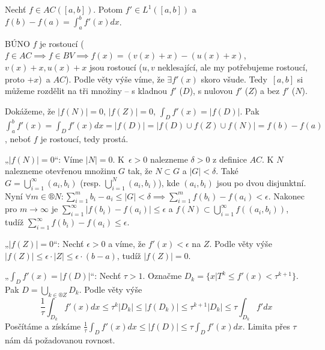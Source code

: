 \documentclass[12pt]{article}					%
\begin{document}
	\begin{veta}
		Nechť $f \in AC([a, b])$. Potom $f' \in L^1([a, b])$ a $f(b) - f(a) = \int_a^b f'(x) dx$.

		\begin{dukazin}
			BÚNO $f$ je rostoucí ($f \in AC \implies f \in BV \implies f(x) = (v(x) + x) - (u(x) + x)$, $v(x) + x, u(x) + x$ jsou rostoucí ($u, v$ neklesající, ale my potřebujeme rostoucí, proto $+x$) a $AC$). Podle věty výše víme, že $\exists f'(x)$ skoro všude. Tedy $[a, b]$ si můžeme rozdělit na tři množiny – s kladnou $f'$ ($D$), s nulovou $f'$ ($Z$) a bez $f'$ ($N$).

			Dokážeme, že $|f(N)| = 0$, $|f(Z)| = 0$, $\int_D f'(x) = |f(D)|$. Pak $\int_a^b f'(x) = \int_D f'(x) dx = |f(D)| = |f(D) \cup f(Z) \cup f(N)| = f(b) - f(a)$, neboť $f$ je rostoucí, tedy prostá.

			„$|f(N)| = 0$“: Víme $|N| = 0$. K $\epsilon > 0$ nalezneme $\delta > 0$ z definice $AC$. K $N$ nalezneme otevřenou množinu $G$ tak, že $N \subset G$ a $|G| < \delta$. Také $G = \bigcup_{i=1}^∞ (a_i, b_i)$ (resp. $\bigcup_{i =1}^N (a_i, b_i)$), kde $(a_i, b_i)$ jsou po dvou disjunktní. Nyní $\forall m \in ®N: \sum_{i=1}^m b_i - a_i ≤ |G| < \delta \implies \sum_{i=1}^m f(b_i) - f(a_i) < \epsilon$. Nakonec pro $m \rightarrow ∞$ je $\sum_{i=1}^∞ |f(b_i) - f(a_i)| ≤ \epsilon$ a $f(N) \subset \bigcup_{i=1}^∞ f((a_i, b_i))$, tudíž $\sum_{i=1}^∞ f(b_i) - f(a_i) ≤ \epsilon$.

			„$|f(Z)| = 0$“: Nechť $\epsilon > 0$ a víme, že $f'(x) < \epsilon$ na $Z$. Podle věty výše $|f(Z)| ≤ \epsilon · |Z| ≤ \epsilon · (b - a)$, tudíž $|f(Z)| = 0$.

			„$\int_D f'(x) = |f(D)|$“: Nechť $\tau > 1$. Označme $D_k = \{x|T^k ≤ f'(x) < \tau^{k+1}\}$. Pak $D = \bigcup_{k \in ®Z} D_k$. Podle věty výše
			$$ \frac{1}{\tau} \int_{D_k} f'(x) dx ≤ \tau^k |D_k| ≤ |f(D_k)| ≤ \tau^{k + 1} |D_k| ≤ \tau \int_{D_k} f' dx $$
			Posčítáme a získáme $\frac{1}{\tau} \int_D f'(x) dx ≤ |f(D)| ≤ \tau \int_D f'(x) dx$. Limita přes $\tau$ nám dá požadovanou rovnost.
		\end{dukazin}
	\end{veta}
\end{document}
